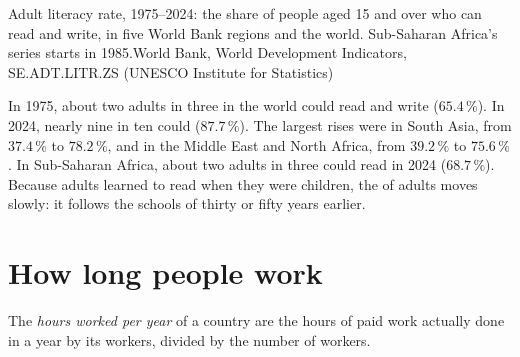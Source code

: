 \begin{omchart}{Adult literacy rate, 1975--2024: the share of people aged 15 and
over who can read and write, in five World Bank regions and the world. Sub-Saharan
Africa's series starts in 1985.}{World Bank, World Development Indicators,
SE.ADT.LITR.ZS (UNESCO Institute for Statistics)}
\end{omchart}

In 1975, about two adults in three in the world could read and write
($65.4\,\%$). In 2024, nearly nine in ten could ($87.7\,\%$). The largest rises
were in South Asia, from $37.4\,\%$ to $78.2\,\%$, and in the Middle East and North
Africa, from $39.2\,\%$ to $75.6\,\%$. In Sub-Saharan Africa, about two adults in
three could read in 2024 ($68.7\,\%$). Because adults learned to read when they
were children, the  of adults moves slowly: it follows the schools
of thirty or fifty years earlier.

\section{How long people work}

\begin{definition}\label{def:g6:school-and-work:hours-worked}
The \emph{hours worked per year} of a country are
the hours of paid work actually done in a year by its workers, divided by the
number of workers.
\end{definition}

